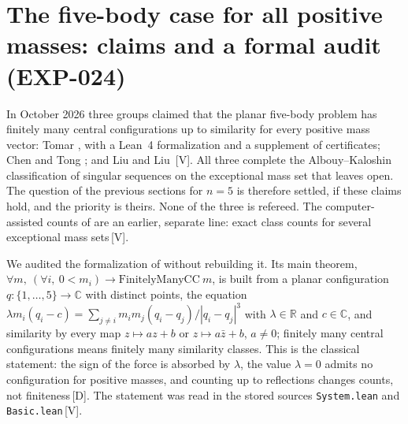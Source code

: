 \documentclass[11pt]{article}
\theoremstyle{definition}
\theoremstyle{remark}
\newcommand{\mk}[1]{\,{\scriptsize[#1]}}
\newcommand{\Dm}{\mk{D}}
\newcommand{\Vm}{\mk{V}}
\begin{document}
\FloatBarrier

\section{The five-body case for all positive masses: claims and a formal audit (EXP-024)}\label{sec:five}

In October 2026 three groups claimed that the planar five-body problem has finitely many central
configurations up to similarity for every positive mass vector: Tomar \cite{Tomar26}, with a Lean~4
formalization and a supplement of certificates; Chen and Tong \cite{ChenTong26}; and Liu and Liu
\cite{LiuLiu26}\Vm. All three complete the Albouy--Kaloshin classification of singular sequences
\cite{AK12} on the exceptional mass set that \cite{AK12} leaves open. The question of the
previous sections for $n=5$ is therefore settled, if these claims hold, and the priority is theirs. None
of the three is refereed. The computer-assisted counts of \cite{MZ26} are an
earlier, separate line: exact class counts for several exceptional mass sets\Vm.

We audited the formalization of \cite{Tomar26} without rebuilding it. Its main theorem,
$\forall m,\ (\forall i,\ 0<m_i)\to\mathrm{FinitelyManyCC}\ m$, is built from a planar configuration
$q:\{1,\dots,5\}\to\mathbb{C}$ with distinct points, the equation
$\lambda m_i(q_i-c)=\sum_{j\ne i}m_im_j(q_i-q_j)/|q_i-q_j|^3$ with $\lambda\in\mathbb{R}$ and
$c\in\mathbb{C}$, and similarity by every map $z\mapsto az+b$ or $z\mapsto a\bar z+b$, $a\ne0$; finitely
many central configurations means finitely many similarity classes. This is the classical statement: the
sign of the force is absorbed by $\lambda$, the value $\lambda=0$ admits no configuration for positive
masses, and counting up to reflections changes counts, not finiteness\Dm. The statement was read in the stored
sources \texttt{System.lean} and \texttt{Basic.lean}\Vm.
\end{document}
